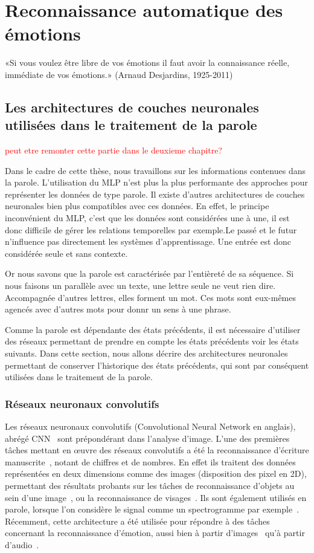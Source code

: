 \chapter{Reconnaissance automatique des émotions}
\label{chapitre3}
«Si vous voulez être libre de vos émotions il faut avoir la connaissance réelle, immédiate de vos émotions.»  (Arnaud Desjardins, 1925-2011)


\section{Les architectures de couches neuronales utilisées dans le traitement de la parole}
\textcolor{red}{peut etre remonter cette partie dans le deuxieme chapitre?}

Dans le cadre de cette thèse, nous travaillons sur les informations contenues dans la parole. L'utilisation du MLP n'est plus la plus performante des approches pour représenter les données de type parole. Il existe d'autres architectures de couches neuronales bien plus compatibles avec ces données. En effet, le principe inconvénient du MLP, c'est que les données sont considérées une à une, il est donc difficile de gérer les relations temporelles par exemple.Le passé et le futur n'influence pas directement les systèmes d'apprentissage. Une entrée est donc considérée seule et sans contexte.

Or nous savons que la parole est caractérisée par l'entièreté de sa séquence. Si nous faisons un parallèle avec un texte, une lettre seule ne veut rien dire. Accompagnée d'autres lettres, elles forment un mot. Ces mots sont eux-mêmes agencés avec d'autres mots pour donnr un sens à une phrase.

Comme la parole est dépendante des états précédents, il est nécessaire d'utiliser des réseaux permettant de prendre en compte les états précédents voir les états suivants. Dans cette section, nous allons décrire des architectures neuronales permettant de conserver l'historique des états précédents, qui sont par conséquent utilisées dans le traitement de la parole.

\subsection{Réseaux neuronaux convolutifs}
Les réseaux neuronaux convolutifs (Convolutional Neural Network en anglais), abrégé CNN~\cite{LeCun1989} sont prépondérant dans l'analyse d'image. L'une des premières tâches mettant en œuvre des réseaux convolutifs a été la reconnaissance d'écriture manuscrite~\cite{LeCun1998}, notant de chiffres et de nombres. En effet ils traitent des données représentées en deux dimensions comme des images (disposition des pixel en 2D), permettant des résultats probants sur les tâches de reconnaissance d'objets au sein d'une image~\cite{Traore2018}, ou la reconnaissance de visages~\cite{Liu2016}. Ils sont également utilisés en parole, lorsque l'on considère le signal comme un spectrogramme par exemple~\cite{Abdel2014}. Récemment, cette architecture a été utilisée pour répondre à des tâches concernant la reconnaissance d'émotion, aussi bien à partir d'images~\cite{Pitaloka2017,Mehendale2020} qu'à partir d'audio~\cite{Zhang2016}.

